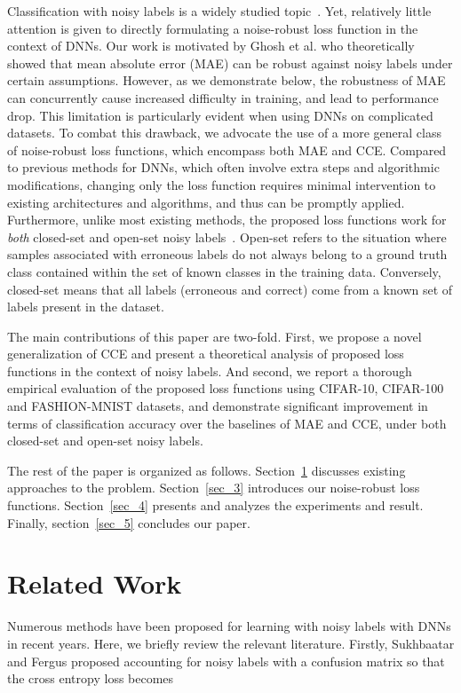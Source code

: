 \documentclass{article}
\begin{document}
Classification with noisy labels is a widely studied topic~\cite{frenay2014classification}. 
Yet, relatively little attention is given to directly formulating a noise-robust loss function in the context of DNNs.
Our work is motivated by Ghosh et al. \cite{ghosh2017robust} who theoretically showed that mean absolute error (MAE) can be robust against noisy labels under certain assumptions.
However, as we demonstrate below, the robustness of MAE can concurrently cause increased difficulty in training, and lead to performance drop. This limitation is particularly evident when using DNNs on complicated datasets. 
To combat this drawback, we advocate the use of a more general class of noise-robust loss functions, which encompass both MAE and CCE. 
Compared to previous methods for DNNs, which often involve extra steps and algorithmic modifications, changing only the loss function requires minimal intervention to existing architectures and algorithms, and thus can be promptly applied. 
Furthermore, unlike most existing methods, the proposed loss functions work for \textit{both} closed-set and open-set noisy labels~\cite{wang2018iterative}.  
Open-set refers to the situation where samples associated with erroneous labels do not always belong to a ground truth class contained within the set of known classes in the training data. 
Conversely, closed-set means that all labels (erroneous and correct) come from a known set of labels present in the dataset.

The main contributions of this paper are two-fold.
First, we propose a novel generalization of CCE and present a theoretical analysis of proposed loss functions in the context of noisy labels. 
And second, we report a thorough empirical evaluation of the proposed loss functions using CIFAR-10, CIFAR-100 and FASHION-MNIST datasets, and demonstrate significant improvement in terms of classification accuracy over the baselines of MAE and CCE, under both closed-set and open-set noisy labels. 

The rest of the paper is organized as follows. Section~\ref{sec_2} discusses existing approaches to the problem. Section~\ref{sec_3} introduces our noise-robust loss functions. Section~\ref{sec_4} presents and analyzes the experiments and result. Finally, section~\ref{sec_5} concludes our paper. 

\section{Related Work}\label{sec_2}
Numerous methods have been proposed for learning with noisy labels with DNNs in recent years. Here, we briefly review the relevant literature. Firstly, Sukhbaatar and Fergus \cite{sukhbaatar2014learning} proposed accounting for noisy labels with a confusion matrix so that the cross entropy loss becomes
\end{document}
